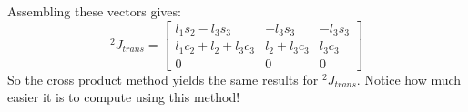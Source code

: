 \documentclass[]{article}
\begin{document}
Assembling these vectors gives:
\begin{displaymath}
^{2}J_{trans} = \left[ \begin{array}{ccc} l_{1}s_{2} - l_{3}s_{3} & -l_{3}s_{3} & -l_{3}s_{3} \\ l_{1}c_{2}+l_{2} + l_{3}c_{3} & l_{2}+l_{3}c_{3} & l_{3}c_{3} \\ 0 & 0 & 0 \end{array} \right]
\end{displaymath}
So the cross product method yields the same results for $^{2}J_{trans}$. Notice how much easier it is to compute using this method!
\end{document}
